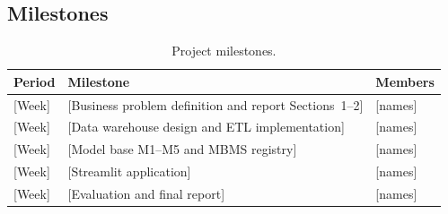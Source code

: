 \subsection{Milestones}

\begin{table}[H]
\centering
\caption{Project milestones.}
\begin{tabularx}{\textwidth}{@{}l X l@{}}
\toprule
\textbf{Period} & \textbf{Milestone} & \textbf{Members} \\
\midrule
{[Week]} & [Business problem definition and report Sections~1--2] & [names] \\
{[Week]} & [Data warehouse design and ETL implementation] & [names] \\
{[Week]} & [Model base M1--M5 and MBMS registry] & [names] \\
{[Week]} & [Streamlit application] & [names] \\
{[Week]} & [Evaluation and final report] & [names] \\
\bottomrule
\end{tabularx}
\end{table}

